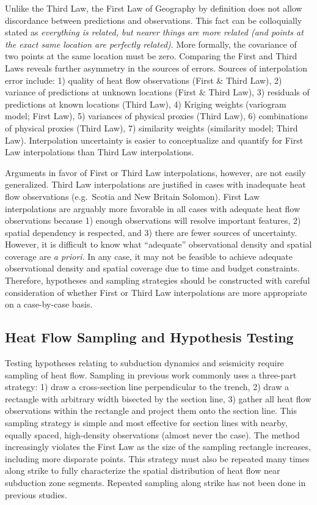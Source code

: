 \documentclass[draft,linenumbers]{agujournal2018}
\begin{document}
Unlike the Third Law, the First Law of Geography by definition does not
allow discordance between predictions and observations. This fact can be
colloquially stated as \emph{everything is related, but nearer things
are more related (and points at the exact same location are perfectly
related)}. More formally, the covariance of two points at the same
location must be zero. Comparing the First and Third Laws reveals
further asymmetry in the sources of errors. Sources of interpolation
error include: 1) quality of heat flow observations (First \& Third
Law), 2) variance of predictions at unknown locations (First \& Third
Law), 3) residuals of predictions at known locations (Third Law), 4)
Kriging weights (variogram model; First Law), 5) variances of physical
proxies (Third Law), 6) combinations of physical proxies (Third Law), 7)
similarity weights (similarity model; Third Law). Interpolation
uncertainty is easier to conceptualize and quantify for First Law
interpolations than Third Law interpolations.

Arguments in favor of First or Third Law interpolations, however, are
not easily generalized. Third Law interpolations are justified in cases
with inadequate heat flow observations (e.g.~Scotia and New Britain
Solomon). First Law interpolations are arguably more favorable in all
cases with adequate heat flow observations because 1) enough
observations will resolve important features, 2) spatial dependency is
respected, and 3) there are fewer sources of uncertainty. However, it is
difficult to know what ``adequate'' observational density and spatial
coverage are \emph{a priori}. In any case, it may not be feasible to
achieve adequate observational density and spatial coverage due to time
and budget constraints. Therefore, hypotheses and sampling strategies
should be constructed with careful consideration of whether First or
Third Law interpolations are more appropriate on a case-by-case basis.

\subsection{Heat Flow Sampling and Hypothesis Testing}

Testing hypotheses relating to subduction dynamics and seismicity
require sampling of heat flow. Sampling in previous work commonly uses a
three-part strategy: 1) draw a cross-section line perpendicular to the
trench, 2) draw a rectangle with arbitrary width bisected by the section
line, 3) gather all heat flow observations within the rectangle and
project them onto the section line. This sampling strategy is simple and
most effective for section lines with nearby, equally spaced,
high-density observations (almost never the case). The method
increasingly violates the First Law as the size of the sampling
rectangle increases, including more disparate points. This strategy must
also be repeated many times along strike to fully characterize the
spatial distribution of heat flow near subduction zone segments.
Repeated sampling along strike has not been done in previous studies.
\end{document}
